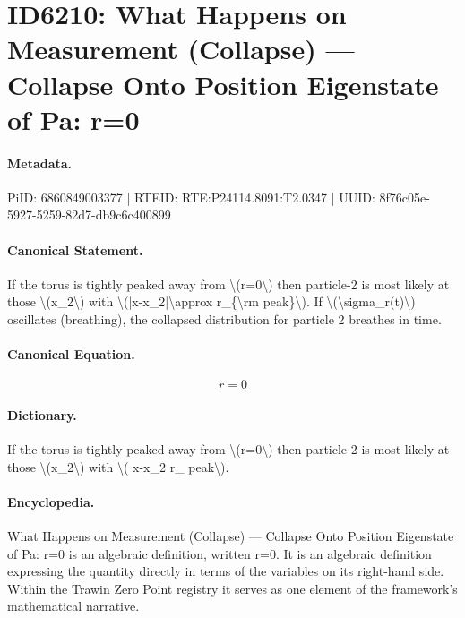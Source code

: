\section*{ID6210: What Happens on Measurement (Collapse) — Collapse Onto Position Eigenstate of Pa: r=0}
\paragraph{Metadata.}
PiID: 6860849003377 | RTEID: RTE:P24114.8091:T2.0347 | UUID: 8f76c05e-5927-5259-82d7-db9c6c400899

\paragraph{Canonical Statement.}
If the torus is tightly peaked away from \textbackslash{}(r=0\textbackslash{}) then particle-2 is most likely at those \textbackslash{}(x\_2\textbackslash{}) with \textbackslash{}(|x-x\_2|\textbackslash{}approx r\_\{\textbackslash{}rm peak\}\textbackslash{}). If \textbackslash{}(\textbackslash{}sigma\_r(t)\textbackslash{}) oscillates (breathing), the collapsed distribution for particle 2 breathes in time.

\paragraph{Canonical Equation.}
\[
r=0
\]

\paragraph{Dictionary.}
If the torus is tightly peaked away from \textbackslash{}(r=0\textbackslash{}) then particle-2 is most likely at those \textbackslash{}(x\_2\textbackslash{}) with \textbackslash{}( x-x\_2 r\_ peak\textbackslash{}).

\paragraph{Encyclopedia.}
What Happens on Measurement (Collapse) — Collapse Onto Position Eigenstate of Pa: r=0 is an algebraic definition, written r=0. It is an algebraic definition expressing the quantity directly in terms of the variables on its right-hand side. Within the Trawin Zero Point registry it serves as one element of the framework's mathematical narrative.
